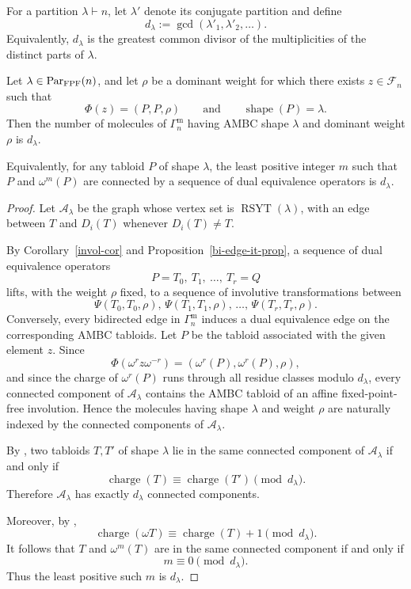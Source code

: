 \documentclass[11pt]{article}
\begin{document}
For a partition $\lambda\vdash n$, let $\lambda'$ denote its
conjugate partition and define
\[
d_\lambda
:=
\gcd(\lambda'_1,\lambda'_2,\ldots).
\]
Equivalently, $d_\lambda$ is the greatest common divisor of the multiplicities of the distinct parts of $\lambda$.

\begin{proposition}\label{molecule-number-prop}
Let $\lambda\in{\operatorname{Par}_{\mathrm{FPF}}}(n)$, and let
$\rho$ be a dominant weight for which there exists
$z\in\mathcal F_n$ such that
\[
\Phi(z)=(P,P,\rho)
\qquad\text{and}\qquad
\operatorname{shape}(P)=\lambda.
\]
Then the number of molecules of $\Gamma_n^{\mathrm m}$ having
AMBC shape $\lambda$ and dominant weight $\rho$ is $d_\lambda$.

Equivalently, for any tabloid $P$ of shape $\lambda$, the least
positive integer $m$ such that $P$ and $\omega^m(P)$ are
connected by a sequence of dual equivalence operators is
$d_\lambda$.
\end{proposition}

\begin{proof}
Let $\mathcal A_\lambda$ be the graph whose vertex set is
$\operatorname{RSYT}(\lambda)$, with an edge between $T$ and
$D_i(T)$ whenever $D_i(T)\neq T$.

By Corollary~\ref{invol-cor} and Proposition~\ref{bi-edge-it-prop}, a sequence of dual
equivalence operators
\[
P=T_0,\ T_1,\ \ldots,\ T_r=Q
\]
lifts, with the weight $\rho$ fixed, to a sequence of
involutive transformations between
\[
\Psi(T_0,T_0,\rho),\,
\Psi(T_1,T_1,\rho),\,
\ldots,\,
\Psi(T_r,T_r,\rho).
\]
Conversely, every bidirected edge in $\Gamma_n^{\mathrm m}$
induces a dual equivalence edge on the corresponding AMBC
tabloids. Let $P$ be the tabloid associated with the given element $z$.
Since
\[
\Phi(\omega^r z\omega^{-r})
=
(\omega^r(P),\omega^r(P),\rho),
\]
and since the charge of $\omega^r(P)$ runs through all residue
classes modulo $d_\lambda$, every connected component of
$\mathcal A_\lambda$ contains the AMBC tabloid of an affine
fixed-point-free involution. Hence the molecules having shape $\lambda$ and weight
$\rho$ are naturally indexed by the connected components of
$\mathcal A_\lambda$.

By \cite[Theorem~8.6]{CLP}, two tabloids $T,T'$ of shape
$\lambda$ lie in the same connected component of
$\mathcal A_\lambda$ if and only if
\[
\operatorname{charge}(T)
\equiv
\operatorname{charge}(T')
\pmod{d_\lambda}.
\]
Therefore $\mathcal A_\lambda$ has exactly $d_\lambda$
connected components.

Moreover, by \cite[Lemma~8.5]{CLP},
\[
\operatorname{charge}(\omega T)
\equiv
\operatorname{charge}(T)+1
\pmod{d_\lambda}.
\]
It follows that $T$ and $\omega^m(T)$ are in the same connected
component if and only if
\[
m\equiv0\pmod{d_\lambda}.
\]
Thus the least positive such $m$ is $d_\lambda$.
\end{proof}
\end{document}
